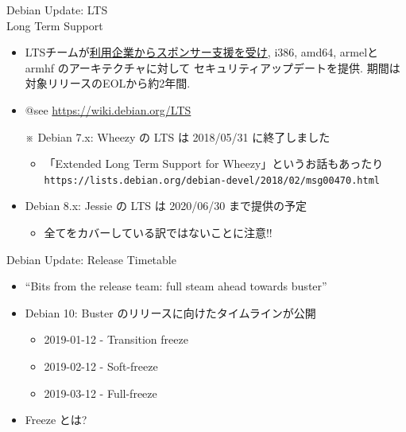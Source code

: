 \documentclass[cjk,c,squeeze,shrink,dvipdfmx,12pt]{beamer}
\begin{document}
\begin{frame}[fragile]{Debian Update: LTS%
    \\[-.5em]{\normalsize{Long Term Support}}
  }
  \pause
  \begin{itemize}[<+->]
  \item %
    LTSチームが\underline{利用企業からスポンサー支援を受け},
    i386, amd64, armelとarmhf のアーキテクチャに対して
    セキュリティアップデートを提供.
    期間は対象リリースのEOLから約2年間.
  \item %
    {\small{@see \href{https://wiki.debian.org/LTS}{https://wiki.debian.org/LTS}}}
  \item[※] %
    \alert{Debian 7.x: Wheezy の LTS は 2018/05/31 に終了しました}
    \begin{itemize}[<+->]
    \item 「Extended Long Term Support for Wheezy」というお話もあったり\\
      {\footnotesize{%
          \texttt{https://lists.debian.org/debian-devel/2018/02/msg00470.html}}}
    \end{itemize}
  \item %
    Debian 8.x: Jessie の LTS は 2020/06/30 まで提供の予定
    \begin{itemize}[<+->]
    \item 全てをカバーしている訳ではないことに注意!!
    \end{itemize}
  \end{itemize}
\end{frame}

\begin{frame}{Debian Update: Release Timetable}
  \pause
  \begin{itemize}[<+->]
  \item ``Bits from the release team: full steam ahead towards buster''
  \item Debian 10: Buster のリリースに向けたタイムラインが公開
    \begin{itemize}
    \item 2019-01-12 - Transition freeze
    \item 2019-02-12 - Soft-freeze
    \item 2019-03-12 - Full-freeze
    \end{itemize}
  \item Freeze とは?
  \end{itemize}
\end{frame}
\end{document}
